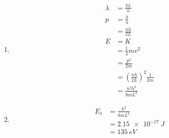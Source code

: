 \documentclass{article}
\begin{document}
\begin{enumerate}
  \item

        \begin{align*}
          \lambda & = \frac{2 L}{n}                                  \\
          p       & = \frac{h}{\lambda}                              \\
                  & = \frac{n h}{2 L}                                \\
          E       & = K                                              \\
                  & = \frac{1}{2} m v^2                              \\
                  & = \frac{p^2}{2 m}                                \\
                  & = \left( \frac{n h}{2 L} \right)^2 \frac{1}{2 m} \\
                  & = \frac{n^2 h^2}{8 m L^2}
        \end{align*}

  \item

        \begin{align*}
          E_1 & = \frac{h^2}{8 m L^2} \\
              & = \qty{2.15e-17}{J}   \\
              & = \qty{135}{eV}
        \end{align*}
\end{enumerate}

\setcounter{subsubsection}{60}
\subsubsection{}
\end{document}
